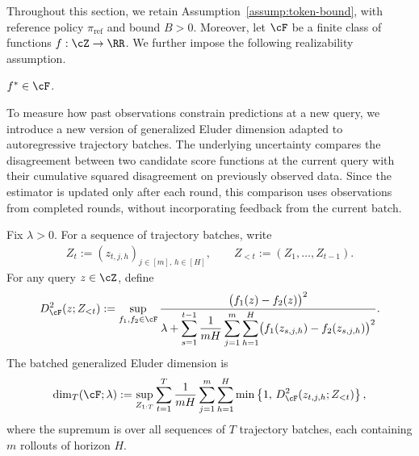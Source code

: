 \documentclass[11pt]{article}
\newcommand{\piref}{\pi_{\text{ref}}}
\begin{document}
Throughout this section, we retain Assumption~\ref{assump:token-bound}, with reference policy
$\piref$ and bound $B >0$. Moreover, let $\cF$ be a finite class of functions $f:\cZ\to\RR$.
We further impose the following realizability assumption.
\begin{assumption}
\label{assump:fa-rkl-realizability}
$f^* \in \cF$.
\end{assumption}
To measure how past observations constrain predictions at a new query, we introduce a new version of generalized Eluder dimension adapted to autoregressive trajectory batches.
The underlying uncertainty compares the disagreement between
two candidate score functions at the current query with their
cumulative squared disagreement on previously observed data.
Since the estimator is updated only after each round, this
comparison uses observations from completed rounds, without
incorporating feedback from the current batch. 
\begin{definition}
\label{def:batched-eluder}
Fix $\lambda>0$.
For a sequence of trajectory batches, write
\begin{align*}
    Z_t
    :=
    (z_{t,j,h})_{j\in[m],\,h\in[H]},
    \qquad
    Z_{<t}:=(Z_1,\ldots,Z_{t-1}).
\end{align*}
For any query $z\in\cZ$, define
\begin{align}
    D_{\cF}^{2}(z;Z_{<t})
    :=
    \sup_{f_1,f_2\in\cF}
    \frac{
        \bigl(f_1(z)-f_2(z)\bigr)^2
    }{
        \lambda+
        \displaystyle\sum_{s=1}^{t-1}
        \frac1{mH}
        \sum_{j=1}^{m}\sum_{h=1}^{H}
        \bigl(
            f_1(z_{s,j,h})-f_2(z_{s,j,h})
        \bigr)^2
    }.
    \label{eq:ar-generalized-uncertainty}
\end{align}
The batched generalized Eluder dimension is
\begin{align}
    \dim_T(\cF;\lambda)
    :=
    \sup_{Z_{1:T}}
    \sum_{t=1}^{T}
    \frac1{mH}
    \sum_{j=1}^{m}\sum_{h=1}^{H}
    \min\left\{
        1,\,
        D_{\cF}^{2}(z_{t,j,h};Z_{<t})
    \right\},
    \label{eq:ar-generalized-eluder}
\end{align}
where the supremum is over all sequences of $T$ trajectory
batches, each containing $m$ rollouts of horizon $H$.
\end{definition}
\end{document}
